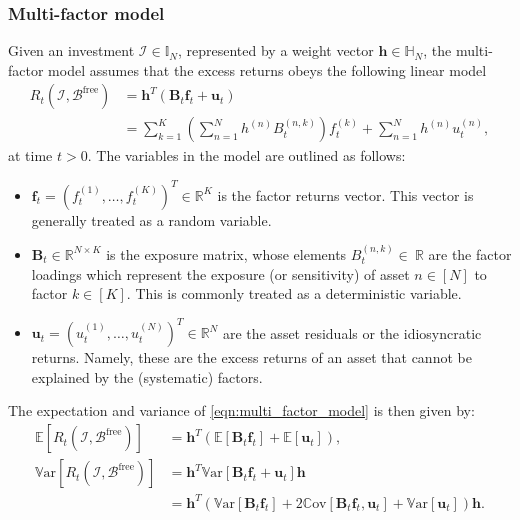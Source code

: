 \documentclass[12pt]{article}
\begin{document}
\subsubsection{Multi-factor model} Given an investment $\mathcal{I} \in \mathbb{I}_N$, represented by a weight vector $\mathbf{h} \in \mathbb{H}_N$, the multi-factor model assumes that the excess returns obeys the following linear model
\begin{align}
	R_t(\mathcal{I}, \mathcal{B}^{\text{free}}) 
	&= \mathbf{h}^T (\mathbf{B}_t \mathbf{f}_t + \mathbf{u}_t)
	\\
	&= \sum_{k=1}^K \left(\sum_{n=1}^N h^{(n)} B_t^{(n, k)} \right) f_t^{(k)} + \sum_{n=1}^N h^{(n)} u^{(n)}_t,
	\label{eqn:multi_factor_model}
\end{align}
at time $t>0$. The variables in the model are outlined as follows:
\begin{itemize}
	\item $\mathbf{f}_t = (f_t^{(1)}, \dots, f_t^{(K)})^T \in \mathbb{R}^K$ is the factor returns vector. This vector is generally treated as a random variable.
	\item $\mathbf{B}_t \in \mathbb{R}^{N \times K}$ is the exposure matrix, whose elements $B_t^{(n, k)} \in\ \mathbb{R}$ are the factor loadings which represent the exposure (or sensitivity) of asset $n \in [N]$ to factor $k \in [K]$. This is commonly treated as a deterministic variable.
	\item $\mathbf{u}_t = (u_t^{(1)}, \dots, u_t^{(N)})^T \in \mathbb{R}^N$ are the asset residuals or the idiosyncratic returns. Namely, these are the excess returns of an asset that cannot be explained by the (systematic) factors.
\end{itemize}
The expectation and variance of \eqref{eqn:multi_factor_model} is then given by:
\begin{align}
	\mathbb{E}[R_t(\mathcal{I}, \mathcal{B}^{\text{free}})] &= \mathbf{h}^T (\mathbb{E}[\mathbf{B}_t \mathbf{f}_t] + \mathbb{E}[\mathbf{u}_t]),
	\\
	\mathbb{V}\text{ar}[R_t(\mathcal{I}, \mathcal{B}^{\text{free}})] 
	&= \mathbf{h}^T \mathbb{V}\text{ar}[\mathbf{B}_t \mathbf{f}_t + \mathbf{u}_t] \mathbf{h}
	\\
	&= \mathbf{h}^T \left(\mathbb{V}\text{ar}[\mathbf{B}_t \mathbf{f}_t] + 2\mathbb{C}\text{ov}[\mathbf{B}_t \mathbf{f}_t, \mathbf{u}_t] + \mathbb{V}\text{ar}[\mathbf{u}_t]\right) \mathbf{h}.
\end{align}
\end{document}

